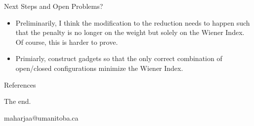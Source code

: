 \documentclass[11pt]{beamer}
\makeatletter
\newcommand{\email}{maharjaa@umanitoba.ca}
\makeatother
\begin{document}
\begin{frame}{Next Steps and Open Problems?}
	\begin{itemize}
		\item Preliminarily, I think the modification to the reduction needs to happen such that the penalty is no longer on the weight but solely on the Wiener Index. Of course, this is harder to prove.
		\item Primiarly, construct gadgets so that the only correct combination of open/closed configurations minimize the Wiener Index.
	\end{itemize}
\end{frame}

\begin{frame}[allowframebreaks]{References}
	
\end{frame}

\begin{frame}
	\begin{center}
		The end.

		\email
	\end{center}
\end{frame}
\end{document}
